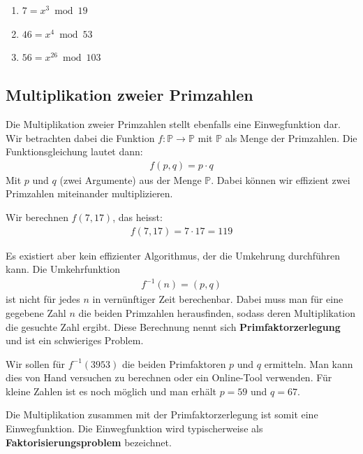 \begin{enumerate}
	\item $7 = x^3 \bmod 19$
	\item $46 = x^4 \bmod 53$
	\item $56 = x^{26} \bmod 103$
\end{enumerate}

\subsection{Multiplikation zweier Primzahlen}

Die Multiplikation zweier Primzahlen stellt ebenfalls eine Einwegfunktion dar. Wir betrachten dabei die Funktion $f: \mathbb{P} \rightarrow \mathbb{P}$ mit $\mathbb{P}$ als Menge der Primzahlen. Die Funktionsgleichung lautet dann:
\begin{align*}
	f(p, q) = p \cdot q
\end{align*}
Mit $p$ und $q$ (zwei Argumente) aus der Menge $\mathbb{P}$. Dabei können wir effizient zwei Primzahlen miteinander multiplizieren.

\begin{example}
	Wir berechnen $f(7, 17)$, das heisst:
	\begin{align*}
		f(7, 17) = 7 \cdot 17 = 119
	\end{align*}
\end{example}

Es existiert aber kein effizienter Algorithmus, der die Umkehrung durchführen kann. Die Umkehrfunktion
\begin{align*}
	f^{-1}(n) = (p, q)
\end{align*}
ist nicht für jedes $n$ in vernünftiger Zeit berechenbar. Dabei muss man für eine gegebene Zahl $n$ die beiden Primzahlen herausfinden, sodass deren Multiplikation die gesuchte Zahl ergibt. Diese Berechnung nennt sich \textbf{Primfaktorzerlegung} und ist ein schwieriges Problem.

\begin{example}
	Wir sollen für $f^{-1}(3953)$ die beiden Primfaktoren $p$ und $q$ ermitteln. Man kann dies von Hand versuchen zu berechnen oder ein Online-Tool verwenden. Für kleine Zahlen ist es noch möglich und man erhält $p = 59$ und $q = 67$.
\end{example}

Die Multiplikation zusammen mit der Primfaktorzerlegung ist somit eine Einwegfunktion. Die Einwegfunktion wird typischerweise als \textbf{Faktorisierungsproblem} bezeichnet.

